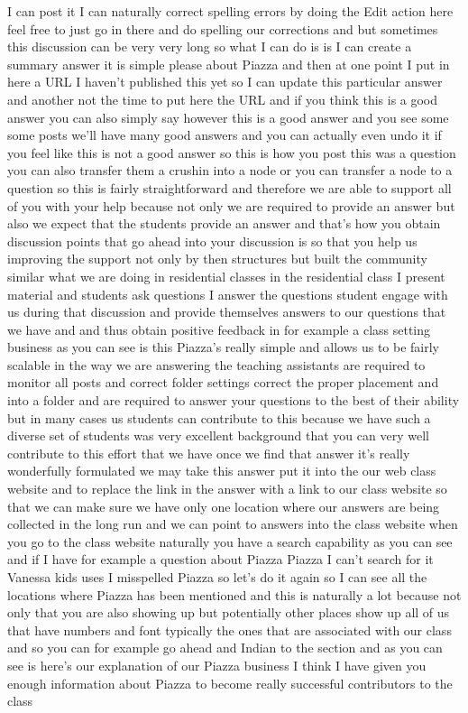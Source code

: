 I can post it I can naturally correct spelling errors by doing the Edit action here feel free to just go in there and do spelling our corrections and but sometimes this discussion can be very very long so what I can do is is I can create a summary answer it is simple please about Piazza and then at one point I put in here a URL I haven't published this yet so I can update this particular answer and another not the time to put here the URL and if you think this is a good answer you can also simply say however this is a good answer and you see some some posts we'll have many good answers and you can actually even undo it if you feel like this is not a good answer so this is how you post this was a question you can also transfer them a crushin into a node or you can transfer a node to a question so this is fairly straightforward and therefore we are able to support all of you with your help because not only we are required to provide an answer but also we expect that the students provide an answer and that's how you obtain discussion points that go ahead into your discussion is so that you help us improving the support not only by then structures but built the community similar what we are doing in residential classes in the residential class I present material and students ask questions I answer the questions student engage with us during that discussion and provide themselves answers to our questions that we have and and thus obtain positive feedback in for example a class setting business as you can see is this Piazza's really simple and allows us to be fairly scalable in the way we are answering the teaching assistants are required to monitor all posts and correct folder settings correct the proper placement and into a folder and are required to answer your questions to the best of their ability but in many cases us students can contribute to this because we have such a diverse set of students was very excellent background that you can very well contribute to this effort that we have once we find that answer it's really wonderfully formulated we may take this answer put it into the our web class website and to replace the link in the answer with a link to our class website so that we can make sure we have only one location where our answers are being collected in the long run and we can point to answers into the class website when you go to the class website naturally you have a search capability as you can see and if I have for example a question about Piazza Piazza I can't search for it Vanessa kids uses I misspelled Piazza so let's do it again so I can see all the locations where Piazza has been mentioned and this is naturally a lot because not only that you are also showing up but potentially other places show up all of us that have numbers and font typically the ones that are associated with our class and so you can for example go ahead and Indian to the section and as you can see is here's our explanation of our Piazza business I think I have given you enough information about Piazza to become really successful contributors to the class
